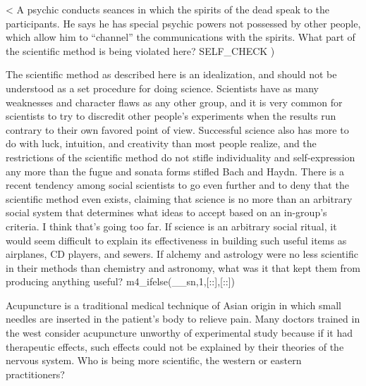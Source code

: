 <%
A psychic conducts seances in which the spirits of the dead
speak to the participants. He says he has special psychic
powers not possessed by other people, which allow him to
``channel'' the communications with the spirits.  What part
of the scientific method is being violated here?
  SELF_CHECK
  ) %

 The scientific method as described here is an idealization,
and should not be understood as a set procedure for doing
science. Scientists have as many weaknesses and character
flaws as any other group, and it is very common for
scientists to try to discredit other people's experiments
when the results run contrary to their own favored point of
view. Successful science also has more to do with luck,
intuition, and creativity than most people realize, and the
restrictions of the scientific method do not stifle
individuality and self-expression any more than the fugue
and sonata forms stifled Bach and Haydn. There is a recent
tendency among social scientists to go even further and to
deny that the scientific method even exists, claiming that
science is no more than an arbitrary social system that
determines what ideas to accept based on an in-group's
criteria. I think that's going too far. If science is an
arbitrary social ritual, it would seem difficult to explain
its effectiveness in building such useful items as
airplanes, CD players, and sewers. If alchemy
and astrology were no less scientific in
their methods than chemistry and astronomy, what was it that
kept them from producing anything useful?
m4_ifelse(__sn,1,[:\enlargethispage{-\baselineskip}:],[::])


\begin{dq}
Acupuncture is a traditional medical technique of Asian
origin in which small needles are inserted in the patient's
body to relieve pain. Many doctors trained in the west
consider acupuncture unworthy of experimental study because
if it had therapeutic effects, such effects could not be
explained by their theories of the nervous system. Who is
being more scientific, the western or eastern practitioners?
\end{dq}

\pagebreak[4]

